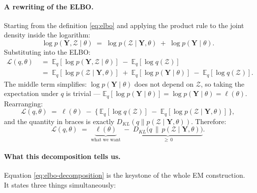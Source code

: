 \documentclass[11pt, a4paper, oneside]{article}
\newcommand{\mY}{\mathbf{Y}}
\begin{document}
\paragraph{A rewriting of the ELBO.}
Starting from the definition \eqref{eq:elbo} and applying the product
rule to the joint density inside the logarithm:
\[
\log p(\mY, \mathcal{Z} \mid \theta) \;=\;
\log p(\mathcal{Z} \mid \mY, \theta) \;+\; \log p(\mY \mid \theta).
\]
Substituting into the ELBO:
\begin{align*}
\mathcal{L}(q, \theta)
&\;=\; \mathbb{E}_q[\log p(\mY, \mathcal{Z} \mid \theta)]
\;-\; \mathbb{E}_q[\log q(\mathcal{Z})] \\[4pt]
&\;=\; \mathbb{E}_q[\log p(\mathcal{Z} \mid \mY, \theta)]
\;+\; \mathbb{E}_q[\log p(\mY \mid \theta)]
\;-\; \mathbb{E}_q[\log q(\mathcal{Z})].
\end{align*}
The middle term simplifies: $\log p(\mY \mid \theta)$ does not depend on
$\mathcal{Z}$, so taking the expectation under $q$ is trivial —
$\mathbb{E}_q[\log p(\mY \mid \theta)] = \log p(\mY \mid \theta) = \ell(\theta)$.
Rearranging:
\[
\mathcal{L}(q, \theta) \;=\; \ell(\theta)
\;-\; \Big\{\,\mathbb{E}_q[\log q(\mathcal{Z})] \;-\; \mathbb{E}_q[\log p(\mathcal{Z} \mid \mY, \theta)]\,\Big\},
\]
and the quantity in braces is exactly
$D_{KL}(q \| p(\mathcal{Z} \mid \mY, \theta))$. Therefore:
\begin{equation}
\boxed{\;\;
\mathcal{L}(q, \theta) \;=\; \underbrace{\ell(\theta)}_{\text{what we want}}
\;-\; \underbrace{D_{KL}\!\big(q \,\|\, p(\mathcal{Z} \mid \mY, \theta)\big)}_{\geq\, 0}.
\;\;}
\label{eq:elbo-decomposition}
\end{equation}

\paragraph{What this decomposition tells us.}
Equation \eqref{eq:elbo-decomposition} is the keystone of the whole EM
construction. It states three things simultaneously:
\end{document}
